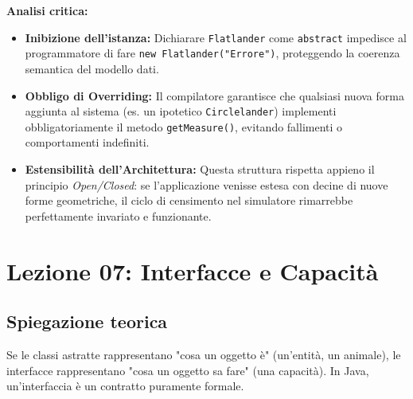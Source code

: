 \documentclass[12pt, a4paper]{article}
\begin{document}
\textbf{Analisi critica:}
\begin{itemize}
    \item \textbf{Inibizione dell'istanza:} Dichiarare \texttt{Flatlander} come \texttt{abstract} impedisce al programmatore di fare \texttt{new Flatlander("Errore")}, proteggendo la coerenza semantica del modello dati.
    \item \textbf{Obbligo di Overriding:} Il compilatore garantisce che qualsiasi nuova forma aggiunta al sistema (es. un ipotetico \texttt{Circlelander}) implementi obbligatoriamente il metodo \texttt{getMeasure()}, evitando fallimenti o comportamenti indefiniti.
    \item \textbf{Estensibilità dell'Architettura:} Questa struttura rispetta appieno il principio \textit{Open/Closed}: se l'applicazione venisse estesa con decine di nuove forme geometriche, il ciclo di censimento nel simulatore rimarrebbe perfettamente invariato e funzionante.
\end{itemize}

\section{Lezione 07: Interfacce e Capacità}

\subsection{Spiegazione teorica}
Se le classi astratte rappresentano "cosa un oggetto è" (un'entità, un animale), le interfacce rappresentano "cosa un oggetto sa fare" (una capacità). In Java, un'interfaccia è un contratto puramente formale.
\end{document}
